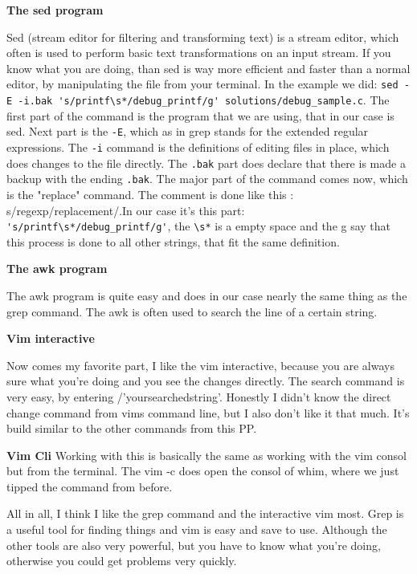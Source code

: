 \documentclass{article}
\begin{document}
\singlespacing

\textbf{The sed program}

Sed (stream editor for filtering and transforming text) is a stream editor, which often is used to perform basic text transformations on an input stream. If you know what you are doing, than sed is way more efficient and faster than a normal editor, by manipulating the file from your terminal. In the example we did: \verb!sed -E -i.bak 's/printf\s*/debug_printf/g' solutions/debug_sample.c!. The first part of the command is the program that we are using, that in our case is sed. Next part is the \verb!-E!, which as in grep stands for the extended regular expressions. The \verb!-i! command is the definitions of editing files in place, which does changes to the file directly. The \verb!.bak! part does declare that there is made a backup with the ending \verb!.bak!. The major part of the command comes now, which is the "replace" command. The comment is done like this : s/regexp/replacement/.In our case it's this part: \verb!'s/printf\s*/debug_printf/g'!, the \verb!\s*! is a empty space and the g say that this process is done to all other strings, that fit the same definition.

\singlespacing

\textbf{The awk program}

The awk program is quite easy and does in our case nearly the same thing as the grep command. The awk is often used to search the line of a certain string.

\singlespacing

\textbf{Vim interactive}

Now comes my favorite part, I like the vim interactive, because you are always sure what you're doing and you see the changes directly. The search command is very easy, by entering /'yoursearchedstring'. Honestly I didn't know the direct change command from vims command line, but I also don't like it that much. It's build similar to the other commands from this PP.

\singlespacing

\textbf{Vim Cli}
Working with this is basically the same as working with the vim consol but from the terminal. The vim -c does open the consol of whim, where we just tipped the command from before.

\singlespacing

All in all, I think I like the grep command and the interactive vim most. Grep is a useful tool for finding things and vim is easy and save to use. Although the other tools are also very powerful, but you have to know what you're doing, otherwise you could get problems very quickly.
\end{document}
